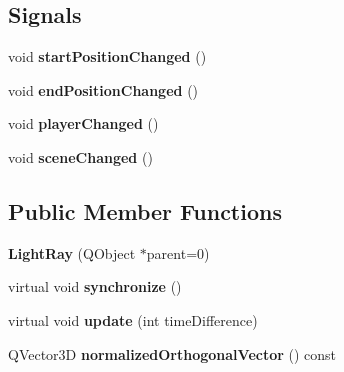 \subsection*{Signals}
\begin{DoxyCompactItemize}
\item 
\hypertarget{class_light_ray_a5be9eb60aae11d0c24e7db4aa1f89b6c}{}void {\bfseries start\+Position\+Changed} ()\label{class_light_ray_a5be9eb60aae11d0c24e7db4aa1f89b6c}

\item 
\hypertarget{class_light_ray_a146c3e8249de30de6340fffbf0c1a4d6}{}void {\bfseries end\+Position\+Changed} ()\label{class_light_ray_a146c3e8249de30de6340fffbf0c1a4d6}

\item 
\hypertarget{class_light_ray_a7b14272e752393259f0b645d92113782}{}void {\bfseries player\+Changed} ()\label{class_light_ray_a7b14272e752393259f0b645d92113782}

\item 
\hypertarget{class_light_ray_aeea833ba9fe0fe8a3810ba002c3dbec4}{}void {\bfseries scene\+Changed} ()\label{class_light_ray_aeea833ba9fe0fe8a3810ba002c3dbec4}

\end{DoxyCompactItemize}
\subsection*{Public Member Functions}
\begin{DoxyCompactItemize}
\item 
\hypertarget{class_light_ray_a311f25dc81f2acfe6bc9f7379f76e6fe}{}{\bfseries Light\+Ray} (Q\+Object $\ast$parent=0)\label{class_light_ray_a311f25dc81f2acfe6bc9f7379f76e6fe}

\item 
\hypertarget{class_light_ray_ab62f10ba7917f59714c9ea44780cb2e6}{}virtual void {\bfseries synchronize} ()\label{class_light_ray_ab62f10ba7917f59714c9ea44780cb2e6}

\item 
\hypertarget{class_light_ray_acf06a71a307433fa5b220baccf809e64}{}virtual void {\bfseries update} (int time\+Difference)\label{class_light_ray_acf06a71a307433fa5b220baccf809e64}

\item 
\hypertarget{class_light_ray_ab8723690d8af8cb9b4ba339eff784135}{}Q\+Vector3\+D {\bfseries normalized\+Orthogonal\+Vector} () const \label{class_light_ray_ab8723690d8af8cb9b4ba339eff784135}

\end{DoxyCompactItemize}
